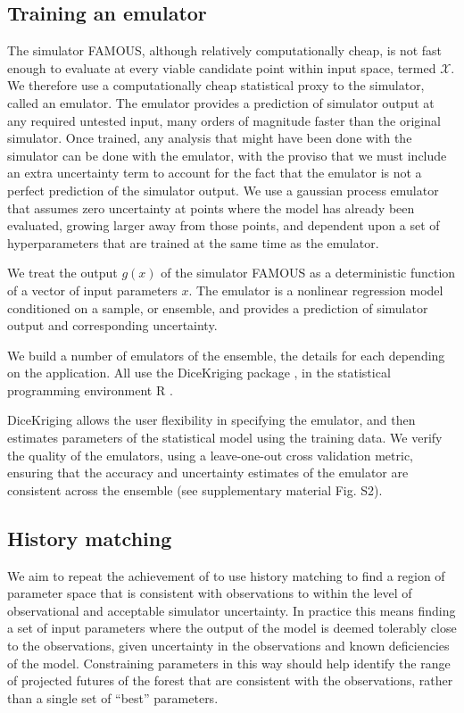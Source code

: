 \documentclass[esd, article]{copernicus} %
\begin{document}
\subsection{Training an emulator}\label{ssec:emulator}
The simulator FAMOUS, although relatively computationally cheap, is not fast enough to evaluate at every viable candidate point within input space, termed $\mathcal{X}$. We therefore use a computationally cheap statistical proxy to the simulator, called an emulator. The emulator provides a prediction of simulator output at any required untested input, many orders of magnitude faster than the original simulator.  Once trained, any analysis that might have been done with the simulator can be done with the emulator, with the proviso that we must include an extra uncertainty term to account for the fact that the emulator is not a perfect prediction of the simulator output. We use a gaussian process emulator that assumes zero uncertainty at points where the model has already been evaluated, growing larger away from those points, and dependent upon a set of hyperparameters that are trained at the same time as the emulator. 

We treat the output $g(x)$ of the simulator FAMOUS as a deterministic function of a vector of input parameters $x$. The emulator is a nonlinear regression model conditioned on a sample, or ensemble, and provides a prediction of simulator output and corresponding uncertainty.

We build a number of emulators of the ensemble, the details for each depending on the application. All use the DiceKriging package \citep{roustant2012dicekriging}, in the statistical programming environment R \citep{Rcore2016}.

DiceKriging allows the user flexibility in specifying the emulator, and then estimates parameters of the statistical model using the training data. We verify the quality of the emulators, using a leave-one-out cross validation metric, ensuring that the accuracy and uncertainty estimates of the emulator are consistent across the ensemble (see supplementary material Fig. S2). 

\subsection{History matching}\label{ssec:historymatching}
We aim to repeat the achievement of \cite{williamson2014identifying} to use history matching to find a region of parameter space that is consistent with observations to within the level of observational and acceptable simulator uncertainty. In practice this means finding a set of input parameters where the output of the model is deemed tolerably close to the observations, given uncertainty in the observations and known deficiencies of the model. Constraining parameters in this way should help identify the range of projected futures of the forest that are consistent with the observations, rather than a single set of ``best'' parameters.
\end{document}
